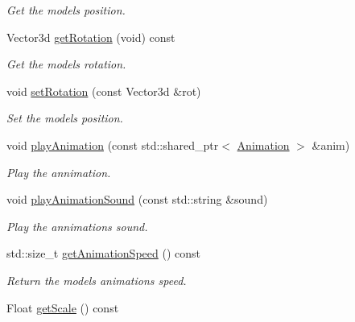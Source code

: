 \begin{DoxyCompactItemize}
\begin{DoxyCompactList}\small\item\em Get the model\textquotesingle{}s position. \end{DoxyCompactList}\item 
\mbox{\label{classModel3d_a10401849cf36b84946774602e73c7ac9}} 
Vector3d \hyperlink{classModel3d_a10401849cf36b84946774602e73c7ac9}{get\+Rotation} (void) const
\begin{DoxyCompactList}\small\item\em Get the model\textquotesingle{}s rotation. \end{DoxyCompactList}\item 
void \hyperlink{classModel3d_adc3c185a679687b4bf483f89eb2c20a9}{set\+Rotation} (const Vector3d \&rot)
\begin{DoxyCompactList}\small\item\em Set the model\textquotesingle{}s position. \end{DoxyCompactList}\item 
void \hyperlink{classModel3d_a108ab9c13b7ae24cc1711c2e97fbc625}{play\+Animation} (const std\+::shared\+\_\+ptr$<$ \hyperlink{structModel3d_1_1Animation}{Animation} $>$ \&anim)
\begin{DoxyCompactList}\small\item\em Play the annimation. \end{DoxyCompactList}\item 
void \hyperlink{classModel3d_a6ce79286c43bd4a6852c544bdad8ee18}{play\+Animation\+Sound} (const std\+::string \&sound)
\begin{DoxyCompactList}\small\item\em Play the annimation\textquotesingle{}s sound. \end{DoxyCompactList}\item 
\mbox{\label{classModel3d_a39fb00dd1aa3bcf6161fb0b1218ec200}} 
std\+::size\+\_\+t \hyperlink{classModel3d_a39fb00dd1aa3bcf6161fb0b1218ec200}{get\+Animation\+Speed} () const
\begin{DoxyCompactList}\small\item\em Return the model\textquotesingle{}s animation\textquotesingle{}s speed. \end{DoxyCompactList}\item 
\mbox{\label{classModel3d_ac3acf0ae583c5ea4b900c291ef95b9af}} 
Float \hyperlink{classModel3d_ac3acf0ae583c5ea4b900c291ef95b9af}{get\+Scale} () const

\end{DoxyCompactItemize}
